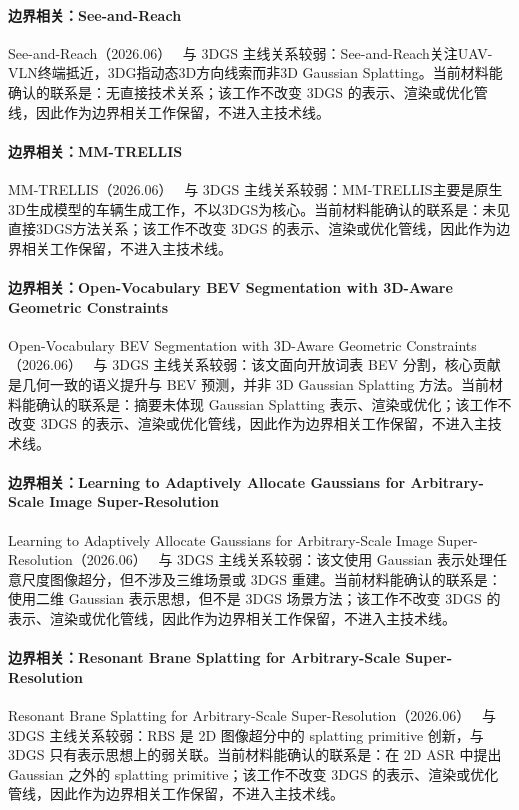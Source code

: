 \paragraph{边界相关：See-and-Reach}
See-and-Reach（2026.06）~\cite{2606_20045} 与 3DGS 主线关系较弱：See-and-Reach关注UAV-VLN终端抵近，3DG指动态3D方向线索而非3D Gaussian Splatting。当前材料能确认的联系是：无直接技术关系；该工作不改变 3DGS 的表示、渲染或优化管线，因此作为边界相关工作保留，不进入主技术线。

\paragraph{边界相关：MM-TRELLIS}
MM-TRELLIS（2026.06）~\cite{2606_24301} 与 3DGS 主线关系较弱：MM-TRELLIS主要是原生3D生成模型的车辆生成工作，不以3DGS为核心。当前材料能确认的联系是：未见直接3DGS方法关系；该工作不改变 3DGS 的表示、渲染或优化管线，因此作为边界相关工作保留，不进入主技术线。

\paragraph{边界相关：Open-Vocabulary BEV Segmentation with 3D-Aware Geometric Constraints}
Open-Vocabulary BEV Segmentation with 3D-Aware Geometric Constraints（2026.06）~\cite{2606_24353} 与 3DGS 主线关系较弱：该文面向开放词表 BEV 分割，核心贡献是几何一致的语义提升与 BEV 预测，并非 3D Gaussian Splatting 方法。当前材料能确认的联系是：摘要未体现 Gaussian Splatting 表示、渲染或优化；该工作不改变 3DGS 的表示、渲染或优化管线，因此作为边界相关工作保留，不进入主技术线。

\paragraph{边界相关：Learning to Adaptively Allocate Gaussians for Arbitrary-Scale Image Super-Resolution}
Learning to Adaptively Allocate Gaussians for Arbitrary-Scale Image Super-Resolution（2026.06）~\cite{2606_29400} 与 3DGS 主线关系较弱：该文使用 Gaussian 表示处理任意尺度图像超分，但不涉及三维场景或 3DGS 重建。当前材料能确认的联系是：使用二维 Gaussian 表示思想，但不是 3DGS 场景方法；该工作不改变 3DGS 的表示、渲染或优化管线，因此作为边界相关工作保留，不进入主技术线。

\paragraph{边界相关：Resonant Brane Splatting for Arbitrary-Scale Super-Resolution}
Resonant Brane Splatting for Arbitrary-Scale Super-Resolution（2026.06）~\cite{2606_29453} 与 3DGS 主线关系较弱：RBS 是 2D 图像超分中的 splatting primitive 创新，与 3DGS 只有表示思想上的弱关联。当前材料能确认的联系是：在 2D ASR 中提出 Gaussian 之外的 splatting primitive；该工作不改变 3DGS 的表示、渲染或优化管线，因此作为边界相关工作保留，不进入主技术线。

